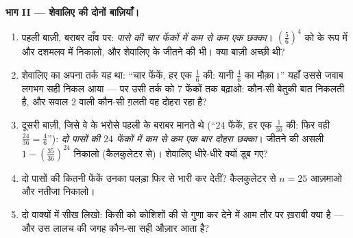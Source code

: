 \begin{problem}
\medskip
\noindent\textbf{भाग II --- शेवालिए की दोनों बाज़ियाँ।}
\begin{enumerate}[resume]
  \item पहली बाज़ी, बराबर दाँव पर: \emph{पासे की चार फेंकों में कम
        से कम एक छक्का}। $\left(\frac56\right)^4$ को  के रूप
        में और दशमलव में निकालो, और शेवालिए के जीतने की 
        भी। क्या बाज़ी अच्छी थी?
  \item शेवालिए का अपना तर्क यह था: ``चार फेंकें, हर एक
        $\frac16$ की: यानी $\frac46$ का मौक़ा।'' यहाँ उससे जवाब
        लगभग सही निकल आया --- पर उसी तर्क को $7$ फेंकों तक बढ़ाओ:
        कौन-सी बेतुकी बात निकलती है, और सवाल 2 वाली कौन-सी ग़लती
        वह दोहरा रहा है?
  \item दूसरी बाज़ी, जिसे वे  के भरोसे पहली के बराबर मानते
        थे (``$24$ फेंकें, हर एक $\frac1{36}$ की: फिर वही
        $\frac{24}{36} = \frac46$''): \emph{दो पासों की $24$
        फेंकों में कम से कम एक बार दोहरा छक्का}। जीतने की असली
         $1 - \left(\frac{35}{36}\right)^{24}$ निकालो
        (कैलकुलेटर से)। शेवालिए धीरे-धीरे क्यों डूब गए?
  \item दो पासों की कितनी फेंकें उनका पलड़ा फिर से भारी कर देतीं?
        कैलकुलेटर से $n = 25$ आज़माओ और नतीजा निकालो।
  \item दो वाक्यों में सीख लिखो: किसी  को कोशिशों की 
        से गुणा कर देने में आम तौर पर ख़राबी क्या है --- और उस
        लालच की जगह कौन-सा सही औज़ार आता है?
\end{enumerate}


\end{problem}
